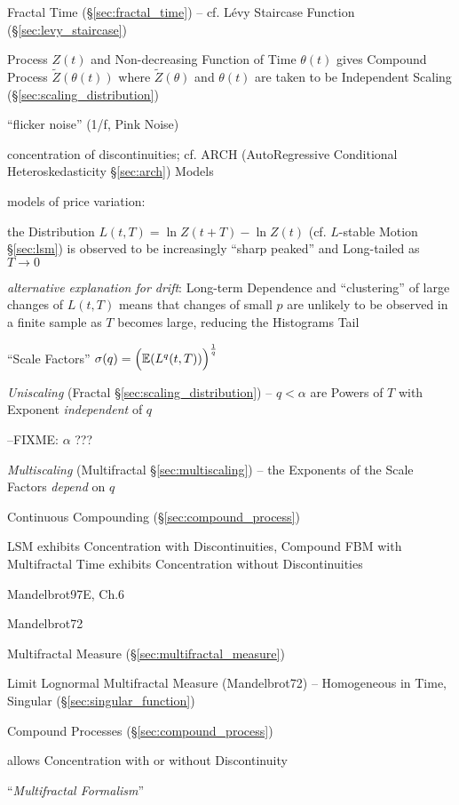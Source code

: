 Fractal Time (\S\ref{sec:fractal_time}) -- cf. L\'evy Staircase Function
(\S\ref{sec:levy_staircase})

Process $Z(t)$ and Non-decreasing Function of Time $\theta(t)$ gives Compound
Process $\tilde{Z}(\theta(t))$ where $\tilde{Z}(\theta)$ and $\theta(t)$ are
taken to be Independent Scaling (\S\ref{sec:scaling_distribution})

``flicker noise'' (1/f, Pink Noise)

concentration of discontinuities; cf. ARCH (AutoRegressive Conditional
Heteroskedasticity \S\ref{sec:arch}) Models

models of price variation:

the Distribution $L(t, T) = \ln Z(t + T) - \ln Z(t)$ (cf. $L$-stable Motion
\S\ref{sec:lsm}) is observed to be increasingly ``sharp peaked'' and Long-tailed
as $T \to 0$

\emph{alternative explanation for drift}: Long-term Dependence and
``clustering'' of large changes of $L(t, T)$ means that changes of small $p$ are
unlikely to be observed in a finite sample as $T$ becomes large, reducing the
Histograms Tail

``Scale Factors'' $\sigma(q) = \Big(\mathbb{E}(L^q(t, T))\Big)^{\frac{1}{q}}$

\emph{Uniscaling} (Fractal \S\ref{sec:scaling_distribution}) -- $q < \alpha$ are
Powers of $T$ with Exponent \emph{independent} of $q$

--FIXME: $\alpha$ ???

\emph{Multiscaling} (Multifractal \S\ref{sec:multiscaling}) -- the Exponents of
the Scale Factors \emph{depend} on $q$

Continuous Compounding (\S\ref{sec:compound_process})

LSM exhibits Concentration with Discontinuities, Compound FBM with Multifractal
Time exhibits Concentration without Discontinuities

Mandelbrot97E, Ch.6

Mandelbrot72

Multifractal Measure (\S\ref{sec:multifractal_measure})

Limit Lognormal Multifractal Measure (Mandelbrot72) -- Homogeneous in Time,
Singular (\S\ref{sec:singular_function})

Compound Processes (\S\ref{sec:compound_process})

allows Concentration with or without Discontinuity

``\emph{Multifractal Formalism}''

